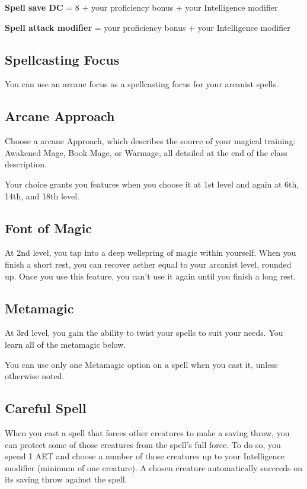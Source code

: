 \textbf{Spell save DC} = 8 + your proficiency bonus + your Intelligence modifier

\textbf{Spell attack modifier} = your proficiency bonus + your Intelligence modifier

\subsection{Spellcasting Focus}

You can use an arcane focus as a spellcasting focus for your arcanist spells.

\subsection{Arcane Approach}

Choose a arcane Approach, which describes the source of your magical training: Awakened Mage, Book Mage, or Warmage, all detailed at the end of the class description.

Your choice grants you features when you choose it at 1st level and again at 6th, 14th, and 18th level.

\subsection{Font of Magic}

At 2nd level, you tap into a deep wellspring of magic within yourself. When you finish a short rest, you can recover aether equal to your arcanist level, rounded up. Once you use this feature, you can't use it again until you finish a long rest.

\subsection{Metamagic}

At 3rd level, you gain the ability to twist your spells to suit your needs. You learn all of the metamagic below.

You can use only one Metamagic option on a spell when you cast it, unless otherwise noted.

\subsection{Careful Spell}

When you cast a spell that forces other creatures to make a saving throw, you can protect some of those creatures from the spell's full force. To do so, you spend 1 AET and choose a number of those creatures up to your Intelligence modifier (minimum of one creature). A chosen creature automatically succeeds on its saving throw against the spell.

